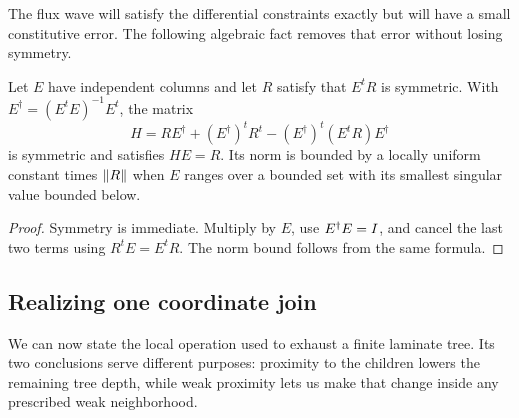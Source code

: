 The flux wave will satisfy the differential constraints exactly but
will have a small constitutive error. The following algebraic fact
removes that error without losing symmetry.

\begin{lemma}
\label{sc:symmetric-correction}
Let $E$ have independent columns and let $R$ satisfy that $E^tR$ is
symmetric. With $E^\dagger=(E^tE)^{-1}E^t$, the matrix
\begin{equation}
 \label{sc:correction-formula}
 H=R E^\dagger+(E^\dagger)^tR^t
       -(E^\dagger)^t(E^tR)E^\dagger
\end{equation}
is symmetric and satisfies $HE=R$. Its norm is bounded by a
locally uniform constant times $\left\lVert R\right\rVert$ when $E$ ranges over a
bounded set with its smallest singular value bounded below.
\end{lemma}

\begin{proof}
Symmetry is immediate. Multiply by $E$, use $E^\dagger E=I$,
and cancel the last two terms using $R^tE=E^tR$. The norm bound
follows from the same formula.
\end{proof}

\subsection{Realizing one coordinate join}

We can now state the local operation used to exhaust a finite laminate
tree. Its two conclusions serve different purposes: proximity to the
children lowers the remaining tree depth, while weak proximity lets us
make that change inside any prescribed weak neighborhood.

